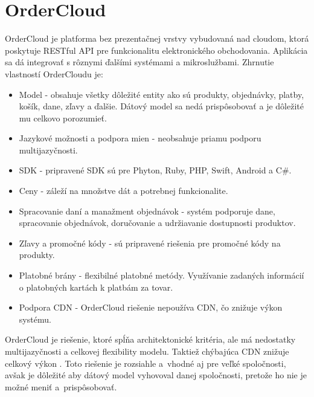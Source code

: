 \documentclass[
  printed, %
  table,   %
  lof,     %
  nolot,     %
  twoside,  
]{fithesis3}
\begin{document}
\section{OrderCloud}
OrderCloud je platforma bez prezentačnej vrstvy vybudovaná nad cloudom, ktorá poskytuje RESTful API pre funkcionalitu elektronického obchodovania. Aplikácia sa dá integrovať s rôznymi ďalšími systémami a mikroslužbami. Zhrnutie vlastností OrderCloudu je:
\begin{itemize}
	\item Model - obsahuje všetky dôležité entity ako sú produkty, objednávky, platby, košík, dane, zľavy a ďalšie. Dátový model sa nedá prispôsobovať a je dôležité mu celkovo porozumieť.
	\item Jazykové možnosti a podpora mien - neobsahuje priamu podporu multijazyčnosti.
	\item SDK - pripravené SDK sú pre Phyton, Ruby, PHP, Swift, Android a C\#.
	\item Ceny - záleží na množstve dát a potrebnej funkcionalite.
	\item Spracovanie daní a manažment objednávok - systém podporuje dane, spracovanie objednávok, doručovanie a udržiavanie dostupnosti produktov. 
	\item Zľavy a promočné kódy - sú pripravené riešenia pre promočné kódy na produkty.
	\item Platobné brány - flexibilné platobné metódy. Využívanie zadaných informácií o platobných kartách k platbám za tovar.
	\item Podpora CDN - OrderCloud riešenie nepoužíva CDN, čo znižuje výkon systému.
		\end{itemize}
OrderCloud je riešenie, ktoré spĺňa architektonické kritéria, ale má nedostatky multijazyčnosti a celkovej flexibility modelu. Taktiež chýbajúca CDN znižuje celkový výkon \cite{ordercloud}. Toto riešenie je rozsiahle a~vhodné aj pre veľké spoločnosti, avšak je dôležité aby dátový model vyhovoval danej spoločnosti, pretože ho nie je možné meniť a~prispôsobovať.
\end{document}
